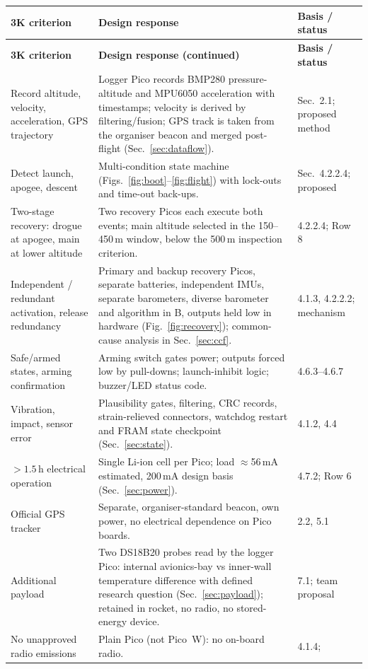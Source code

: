 \small
{}
\begin{longtable}{@{}L{34mm}L{70mm}L{46mm}@{}}
\toprule{}\textbf{3K criterion}&\textbf{Design response}&\textbf{Basis / status}\\\midrule\endfirsthead
\toprule{}\textbf{3K criterion}&\textbf{Design response (continued)}&\textbf{Basis / status}\\\midrule\endhead
\bottomrule\endlastfoot
Record altitude, velocity, acceleration, GPS trajectory & Logger Pico records BMP280 pressure-altitude and MPU6050 acceleration with timestamps; velocity is derived by filtering/fusion; GPS track is taken from the organiser beacon and merged post-flight (Sec.~\ref{sec:dataflow}). & \cite{rtc2027app03} Sec.~2.1; proposed method\\
Detect launch, apogee, descent & Multi-condition state machine (Figs.~\ref{fig:boot}--\ref{fig:flight}) with lock-outs and time-out back-ups. & \cite{rtc2027app03} Sec.~4.2.2.4; proposed\\
Two-stage recovery: drogue at apogee, main at lower altitude & Two recovery Picos each execute both events; main altitude selected in the 150--450\,m window, below the 500\,m inspection criterion. & \cite{rtc2027app03} 4.2.2.4; \cite{rtc2027app08} Row 8\\
Independent / redundant activation, release redundancy & Primary and backup recovery Picos, separate batteries, independent IMUs, separate barometers, diverse barometer and algorithm in B, outputs held low in hardware (Fig.~\ref{fig:recovery}); common-cause analysis in Sec.~\ref{sec:ccf}. & \cite{rtc2027app03} 4.1.3, 4.2.2.2; mechanism \\
Safe/armed states, arming confirmation & Arming switch gates power; outputs forced low by pull-downs; launch-inhibit logic; buzzer/LED status code. & \cite{rtc2027app03} 4.6.3--4.6.7\\
Vibration, impact, sensor error & Plausibility gates, filtering, CRC records, strain-relieved connectors, watchdog restart and FRAM state checkpoint (Sec.~\ref{sec:state}). & \cite{rtc2027app03} 4.1.2, 4.4\\
$>1.5$\,h electrical operation & Single Li-ion cell per Pico; load $\approx$56\,mA estimated, 200\,mA design basis (Sec.~\ref{sec:power}). & \cite{rtc2027app03} 4.7.2; \cite{rtc2027app08} Row 6\\
Official GPS tracker & Separate, organiser-standard beacon, own power, no electrical dependence on Pico boards. & \cite{rtc2027app03} 2.2, 5.1\\
Additional payload & Two DS18B20 probes read by the logger Pico: internal avionics-bay vs inner-wall temperature difference with defined research question (Sec.~\ref{sec:payload}); retained in rocket, no radio, no stored-energy device. & \cite{rtc2027app03} 7.1; team proposal\\
No unapproved radio emissions & Plain Pico (not Pico~W): no on-board radio. & \cite{rtc2027app03} 4.1.4; \cite{picods}\\
\end{longtable}
\normalsize

